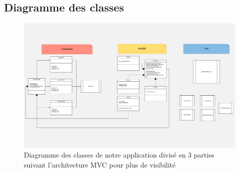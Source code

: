 \documentclass[11pt,a4paper]{article}
\begin{document}
\subsection{Diagramme des classes}
\newpage
\begin{figure}[!h]
\includegraphics[angle=270, scale=0.4]{Image/Class_Diagram_dev2.pdf}
\caption{Diagramme des classes de notre application divisé en 3 parties suivant l'architecture MVC pour plus de visibilité}
\end{figure}
\end{document}
